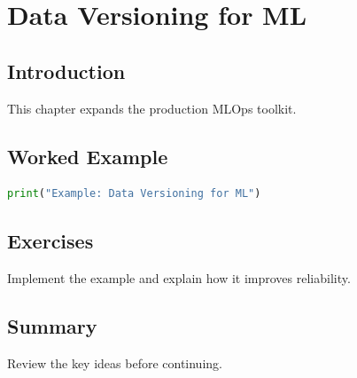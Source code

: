 \chapter{Data Versioning for ML}
\label{chap:vol10-7}



\section{Introduction}
This chapter expands the production MLOps toolkit.

\section{Worked Example}
\begin{lstlisting}[language=Python]
print("Example: Data Versioning for ML")
\end{lstlisting}

\section{Exercises}
\begin{exercise}
Implement the example and explain how it improves reliability.
\end{exercise}

\section{Summary}
Review the key ideas before continuing.
